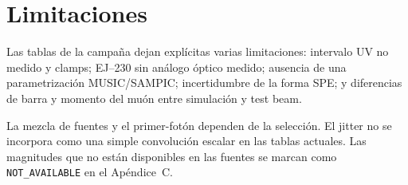 \chapter{Limitaciones}
Las tablas de la campaña dejan explícitas varias limitaciones: intervalo UV no medido y clamps; EJ--230 sin análogo óptico medido; ausencia de una parametrización MUSIC/SAMPIC; incertidumbre de la forma SPE; y diferencias de barra y momento del muón entre simulación y test beam.

La mezcla de fuentes y el primer-fotón dependen de la selección. El jitter no se incorpora como una simple convolución escalar en las tablas actuales. Las magnitudes que no están disponibles en las fuentes se marcan como \texttt{NOT\_AVAILABLE} en el Apéndice~C.
